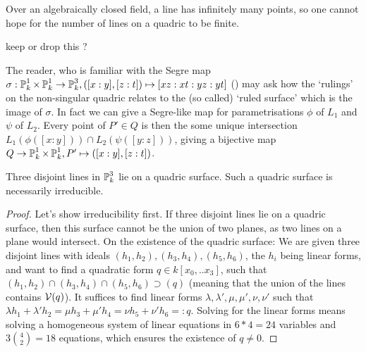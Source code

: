 \begin{remark}
Over an algebraically closed field, a line has infinitely many points, so one cannot hope for the number of lines on a quadric to be finite.
\end{remark}

\begin{remark}
\begin{todo}
\item keep or drop this ?
\end{todo}
The reader, who is familiar with the Segre map $\sigma : \operatorname{\mathbb P}^1_k \times \operatorname{\mathbb P}^1_k \to \operatorname{\mathbb P}^3_k, ([x:y],[z:t]) \mapsto [xz:xt:yz:yt]$ (\cite[example 2.11]{harris1992algebraic}) may ask how the `rulings' on the non-singular quadric relates to the (so called) `ruled surface' which is the image of $\sigma$.
In fact we can give a Segre-like map for parametrisations $\phi$ of $L_1$ and $\psi$ of $L_2$.
Every point of $P' \in Q$ is then the some unique intersection $L_1(\phi([x:y])) \cap L_2(\psi([y:z]))$, giving a bijective map $Q \to \operatorname{\mathbb P}^1_k \times \operatorname{\mathbb P}^1_k, P' \mapsto ([x:y],[z:t])$.
\end{remark}


\begin{lemma} \label{lemmaThreeLines}
Three disjoint lines in $\operatorname{\mathbb P}^3_k$ lie on a quadric surface.
Such a quadric surface is necessarily irreducible.
\end{lemma}
\begin{proof}
Let's show irreducibility first.
If three disjoint lines lie on a quadric surface, then this surface cannot be the union of two planes, as two lines on a plane would intersect.
On the existence of the quadric surface:
We are given three disjoint lines with ideals $(h_1,h_2), (h_3,h_4), (h_5,h_6)$, the $h_i$ being linear forms, and want to find a quadratic form $q \in k[x_0,..x_3]$, such that $(h_1,h_2) \cap (h_3,h_4) \cap (h_5,h_6) \supset (q)$ (meaning that the union of the lines contains $\operatorname{\mathcal V}(q)$).
It suffices to find linear forms $\lambda,\lambda',\mu,\mu',\nu,\nu'$ such that
$\lambda h_1 + \lambda' h_2 = \mu h_3 + \mu' h_4 = \nu h_5 + \nu' h_6 =: q$.
Solving for the linear forms means solving a homogeneous system of linear equations in $6*4= 24$ variables and $3\binom{4}{2} = 18$ equations, which ensures the existence of $q \neq 0$.
\end{proof}

